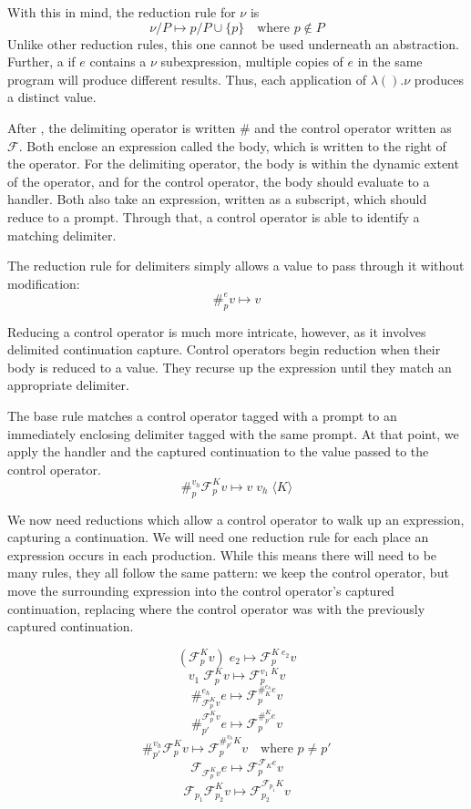 \documentclass[11pt]{article}
\newcommand\F{\mathcal{F}}
\newcommand{\angles}[1]{\langle#1\rangle}
\begin{document}
With this in mind, the reduction rule for $\nu$ is
$$\nu/P \mapsto p/P\cup\{p\} \quad\textrm{where }p \notin P$$
Unlike other reduction rules, this one cannot be used underneath an abstraction.
Further, a if $e$ contains a $\nu$ subexpression, multiple copies of $e$ in the same program will produce different results.
Thus, each application of $\lambda().\nu$ produces a distinct value.


After \cite{PromptApplication}, the delimiting operator is written $\#$ and the control operator written as $\F$.
Both enclose an expression called the body, which is written to the right of the operator.
For the delimiting operator, the body is within the dynamic extent of the operator, and for the control operator, the body should evaluate to a handler.
Both also take an expression, written as a subscript, which should reduce to a prompt. Through that, a control operator is able to identify a matching delimiter.

The reduction rule for delimiters simply allows a value to pass through it without modification:
$$\#_p^e v \mapsto v$$

Reducing a control operator is much more intricate, however, as it involves delimited continuation capture.
Control operators begin reduction when their body is reduced to a value.
They recurse up the expression until they match an appropriate delimiter.

The base rule matches a control operator tagged with a prompt to an immediately enclosing delimiter tagged with the same prompt.
At that point, we apply the handler and the captured continuation to the value passed to the control operator.
$$\#_p^{v_h}\F_p^Kv \mapsto v\;v_h\;\angles K$$

We now need reductions which allow a control operator to walk up an expression, capturing a continuation.
We will need one reduction rule for each place an expression occurs in each production.
While this means there will need to be many rules, they all follow the same pattern:
we keep the control operator, but move the surrounding expression into the control operator's captured continuation, replacing where the control operator was with the previously captured continuation.

$$(\F^K_pv)\;e_2 \mapsto \F^{K\;e_2}_pv$$
$$v_1\;\F^K_pv \mapsto \F^{v_1\;K}_pv$$
$$\#_{\F_p^Kv}^{e_h}e \mapsto \F_p^{\#_K^{e_h}e}v$$
$$\#^{\F_p^Kv}_{p'}e \mapsto \F_p^{\#^K_{p'}e}v$$
$$\#_{p'}^{v_h}\F^K_pv \mapsto \F^{\#_{p'}^{v_h}K}_pv
  	\quad\textrm{where }p \neq p'$$
$$\F_{\F^K_pv}e \mapsto \F^{\F_Ke}_pv$$
$$\F_{p_1}\F^K_{p_2}v \mapsto \F^{\F_{p_1}K}_{p_2}v$$
\end{document}
